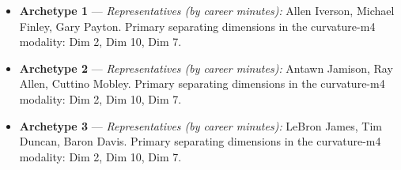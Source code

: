 \begin{itemize}
\item \textbf{Archetype 1} --- \emph{Representatives (by career minutes):} Allen Iverson, Michael Finley, Gary Payton. Primary separating dimensions in the curvature-m4 modality: Dim 2, Dim 10, Dim 7.
\item \textbf{Archetype 2} --- \emph{Representatives (by career minutes):} Antawn Jamison, Ray Allen, Cuttino Mobley. Primary separating dimensions in the curvature-m4 modality: Dim 2, Dim 10, Dim 7.
\item \textbf{Archetype 3} --- \emph{Representatives (by career minutes):} LeBron James, Tim Duncan, Baron Davis. Primary separating dimensions in the curvature-m4 modality: Dim 2, Dim 10, Dim 7.
\end{itemize}
